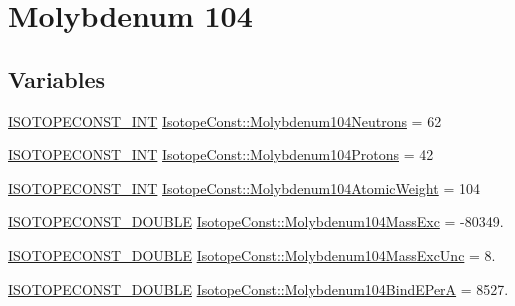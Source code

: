 \hypertarget{group___isotope_const-_molybdenum-_mo104}{}\section{Molybdenum 104}
\label{group___isotope_const-_molybdenum-_mo104}
\subsection*{Variables}
\begin{DoxyCompactItemize}
\item 
\mbox{\hyperlink{group___isotope_const-_macros_ga5f18360b3e99483a35c32d789e62621c}{I\+S\+O\+T\+O\+P\+E\+C\+O\+N\+S\+T\+\_\+\+I\+NT}} \mbox{\hyperlink{group___isotope_const-_molybdenum-_mo104_gae64ea6235001deecca402986f38fcfd0}{Isotope\+Const\+::\+Molybdenum104\+Neutrons}} = 62
\item 
\mbox{\hyperlink{group___isotope_const-_macros_ga5f18360b3e99483a35c32d789e62621c}{I\+S\+O\+T\+O\+P\+E\+C\+O\+N\+S\+T\+\_\+\+I\+NT}} \mbox{\hyperlink{group___isotope_const-_molybdenum-_mo104_ga39ab7bd84de192ffdb72c9d1c623fb77}{Isotope\+Const\+::\+Molybdenum104\+Protons}} = 42
\item 
\mbox{\hyperlink{group___isotope_const-_macros_ga5f18360b3e99483a35c32d789e62621c}{I\+S\+O\+T\+O\+P\+E\+C\+O\+N\+S\+T\+\_\+\+I\+NT}} \mbox{\hyperlink{group___isotope_const-_molybdenum-_mo104_gac373402e703a22856ce6ccd14fba92aa}{Isotope\+Const\+::\+Molybdenum104\+Atomic\+Weight}} = 104
\item 
\mbox{\hyperlink{group___isotope_const-_macros_ga8f45a7272ce02c0b4c65c44636ed719a}{I\+S\+O\+T\+O\+P\+E\+C\+O\+N\+S\+T\+\_\+\+D\+O\+U\+B\+LE}} \mbox{\hyperlink{group___isotope_const-_molybdenum-_mo104_gac0f4a5a3b46e27731a86d2bb8b60f379}{Isotope\+Const\+::\+Molybdenum104\+Mass\+Exc}} = -\/80349.
\item 
\mbox{\hyperlink{group___isotope_const-_macros_ga8f45a7272ce02c0b4c65c44636ed719a}{I\+S\+O\+T\+O\+P\+E\+C\+O\+N\+S\+T\+\_\+\+D\+O\+U\+B\+LE}} \mbox{\hyperlink{group___isotope_const-_molybdenum-_mo104_gae3949d7c43354fd379c150e73ca2a09c}{Isotope\+Const\+::\+Molybdenum104\+Mass\+Exc\+Unc}} = 8.
\item 
\mbox{\hyperlink{group___isotope_const-_macros_ga8f45a7272ce02c0b4c65c44636ed719a}{I\+S\+O\+T\+O\+P\+E\+C\+O\+N\+S\+T\+\_\+\+D\+O\+U\+B\+LE}} \mbox{\hyperlink{group___isotope_const-_molybdenum-_mo104_ga603f32c6a17cdb227463ce6b7153777d}{Isotope\+Const\+::\+Molybdenum104\+Bind\+E\+PerA}} = 8527.

\end{DoxyCompactItemize}
